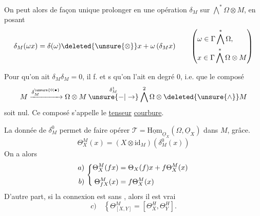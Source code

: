 On peut alors de façon unique prolonger en une  opération $\delta_M$ sur $\bigwedge^*\Omega\otimes M$, en posant
\[
\delta_M(\omega x)=\delta(\omega)\deleted{\unsure{\otimes}}x+\omega\,(\delta_M x)
\qquad\left(\begin{aligned}
&\omega\in\Gamma\bigwedge^*\Omega,\\
&x\in\Gamma\bigwedge^*\Omega\otimes M
\end{aligned}\right)
\]

Pour qu'on ait $\delta_M\delta_M=0$, il f. et s qu'on l'ait  en degré 0, i.e. que le composé
\[
M\xrightarrow{\delta_M^{\unsure{0|\bullet}}}\Omega\otimes M
\overset{\delta_M^1}{\mathbin{\unsure{-|\to}}}\bigwedge^2\Omega\otimes\deleted{\unsure{\wedge}} M
\]
soit nul. Ce composé s'appelle le \uline{tenseur} \uline{courbure}.

La donnée de  $\delta_M^0$ permet de faire opérer $\mathscr T=\underline{\mathrm{Hom}}_{\underline O_X}(\Omega,\underline O_X)$ dans $M$, grâce.
\[
\Theta_X^M(x)=(X\otimes\mathrm{id}_M)(\delta_M^0(x))
\]
On a alors
\[
\begin{array}{r@{\ }l}
\begin{aligned}a)\\[1ex] b)\end{aligned}&
\left\{\begin{aligned}
\Theta_X^M(fx)&=\Theta_X(f)x+f\Theta_X^M(x)\\[1ex]
\Theta_{fX}^M(x)&=f\Theta_X^M(x)
\end{aligned}\right.
\end{array}
\]
D'autre part, si la connexion est sans , alors il est vrai 
\[
c)\quad\left\{\Theta^M_{[X,Y]}=[\Theta_X^{H},\Theta_Y^{H}].\right.
\]


